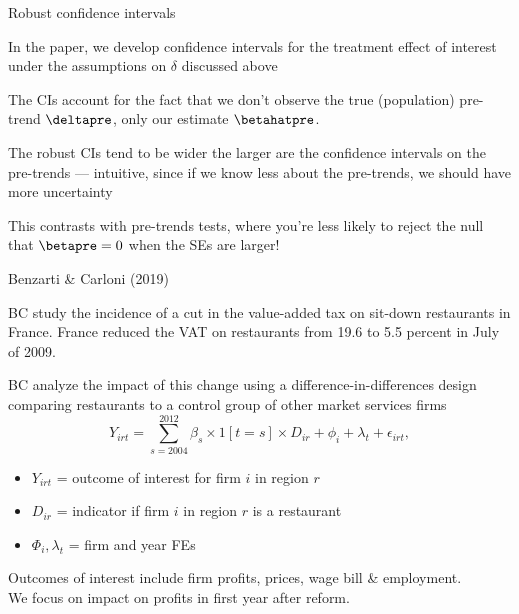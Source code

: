 \documentclass[aspectratio = 169, 13pt]{beamer}
\begin{document}
\begin{frame}{Robust confidence intervals}
	\begin{wideitemize}
		\item
		In the paper, we develop confidence intervals for the treatment effect of interest under the assumptions on $\delta$ discussed above
		
		\item
		The CIs account for the fact that we don't observe the true (population) pre-trend $\deltapre$, only our estimate $\betahatpre$. 
		
		\item
		The robust CIs tend to be wider the larger are the confidence intervals on the pre-trends --- intuitive, since if we know less about the pre-trends, we should have more uncertainty
		
		\item
		This contrasts with pre-trends tests, where you're less likely to reject the null that $\betapre =0$ when the SEs are larger!
	\end{wideitemize}
\end{frame}


\begin{frame}{Benzarti \& Carloni (2019)}
	\begin{wideitemize}
		\item
		BC study the incidence of a cut in the value-added tax on sit-down restaurants in France.
		France reduced the VAT on restaurants from 19.6 to 5.5 percent in July of 2009. 
		
		\item
		BC analyze the impact of this change using a difference-in-differences design comparing restaurants to a control group of other market services firms
		\vspace{-3mm}
		\begin{equation}
			Y_{irt} = \sum_{s = 2004}^{2012} \beta_s \times 1[t = s] \times  D_{ir} + \phi_i + \lambda_t + \epsilon_{irt} , \label{eqn: bc event-study spec}    
		\end{equation}
		\vspace{-3mm}
		\noindent 
    \begin{itemize}
      \item $Y_{irt}$ = outcome of interest for firm $i$ in region $r$
      \item $D_{ir}$ = indicator if firm $i$ in region $r$ is a restaurant
      \item $\Phi_i, \lambda_t$ = firm and year FEs
		\end{itemize}
		
		\item Outcomes of interest include firm profits, prices, wage bill \& employment.\\
		We focus on impact on profits in first year after reform.
	\end{wideitemize}
\end{frame}
\end{document}
